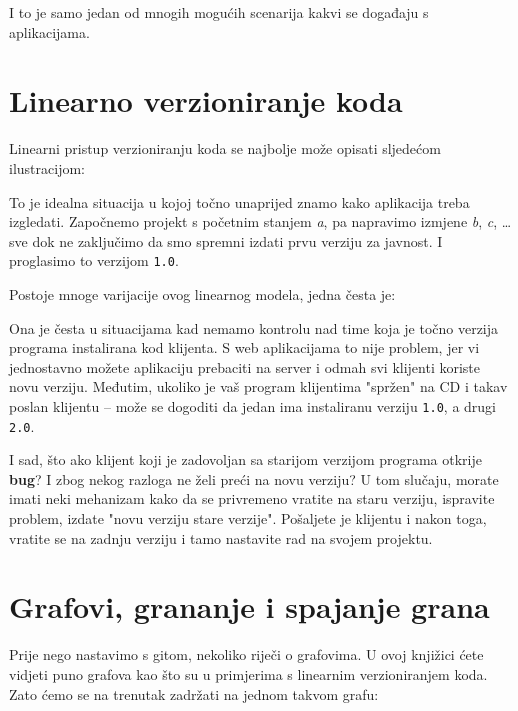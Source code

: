 I to je samo jedan od mnogih mogućih scenarija kakvi se događaju s aplikacijama.

\section*{Linearno verzioniranje koda}

Linearni pristup verzioniranju koda se najbolje može opisati sljedećom ilustracijom:



To je idealna situacija u kojoj točno unaprijed znamo kako aplikacija treba izgledati. 
Započnemo projekt s početnim stanjem \emph a, pa napravimo izmjene \emph b, \emph c, \dots sve dok ne zaključimo da smo spremni izdati prvu verziju za javnost.
I proglasimo to verzijom \texttt{1.0}. 

Postoje mnoge varijacije ovog linearnog modela, jedna česta je:



Ona je česta u situacijama kad nemamo kontrolu nad time koja je točno verzija programa instalirana kod klijenta. 
S web aplikacijama to nije problem, jer vi jednostavno možete aplikaciju prebaciti na server i odmah svi klijenti koriste novu verziju.
Međutim, ukoliko je vaš program klijentima "spržen" na CD i takav poslan klijentu -- može se dogoditi da jedan ima instaliranu verziju \texttt{1.0}, a drugi \texttt{2.0}.

I sad, što ako klijent koji je zadovoljan sa starijom verzijom programa otkrije \textbf{bug}?
I zbog nekog razloga ne želi preći na novu verziju?
U tom slučaju, morate imati neki mehanizam kako da se privremeno vratite na staru verziju, ispravite problem, izdate "novu verziju stare verzije". 
Pošaljete je klijentu i nakon toga, vratite se na zadnju verziju i tamo nastavite rad na svojem projektu.

\section*{Grafovi, grananje i spajanje grana}

Prije nego nastavimo s gitom, nekoliko riječi o grafovima. 
U ovoj knjižici ćete vidjeti puno grafova kao što su u primjerima s linearnim verzioniranjem koda. 
Zato ćemo se na trenutak zadržati na jednom takvom grafu:


